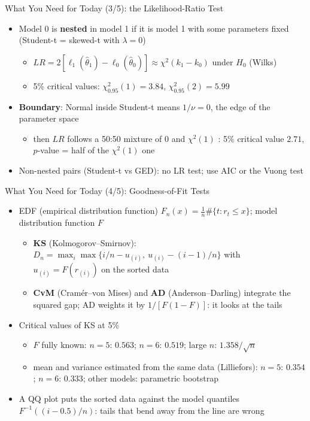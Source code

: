 \begin{frame}{What You Need for Today (3/5): the Likelihood-Ratio Test}
\itemsize{\small}
\begin{itemize}
    \item Model 0 is \textbf{nested} in model 1 if it is model 1 with some parameters fixed (Student-t = skewed-t with $\lambda = 0$)
    \begin{itemize}
        \item $LR = 2[\ell_1(\hat\theta_1) - \ell_0(\hat\theta_0)] \approx \chi^2(k_1 - k_0)$ under $H_0$ (Wilks)
        \item 5\% critical values: $\chi^2_{0.95}(1) = 3.84$, $\chi^2_{0.95}(2) = 5.99$
    \end{itemize}
    \item \textbf{Boundary}: Normal inside Student-t means $1/\nu = 0$, the edge of the parameter space
    \begin{itemize}
        \item then $LR$ follows a 50:50 mixture of 0 and $\chi^2(1)$ : 5\% critical value $2.71$, $p$-value = half of the $\chi^2(1)$ one
    \end{itemize}
    \item Non-nested pairs (Student-t vs GED): no LR test; use AIC or the Vuong test
\end{itemize}
\end{frame}

\begin{frame}{What You Need for Today (4/5): Goodness-of-Fit Tests}
\itemsize{\small}
\begin{itemize}
    \item EDF (empirical distribution function) $F_n(x) = \frac{1}{n}\#\{t: r_t \le x\}$; model distribution function $F$
    \begin{itemize}
        \item \textbf{KS} (Kolmogorov--Smirnov): $D_n = \max_i \max\{i/n - u_{(i)},\ u_{(i)} - (i-1)/n\}$ with $u_{(i)} = F(r_{(i)})$ on the sorted data
        \item \textbf{CvM} (Cramér--von Mises) and \textbf{AD} (Anderson--Darling) integrate the squared gap; AD weights it by $1/[F(1-F)]$: it looks at the tails
    \end{itemize}
    \item Critical values of KS at 5\%
    \begin{itemize}
        \item $F$ fully known: $n = 5$: $0.563$; $n = 6$: $0.519$; large $n$: $1.358/\sqrt{n}$
        \item mean and variance estimated from the same data (Lilliefors): $n = 5$: $0.354$; $n = 6$: $0.333$; other models: parametric bootstrap
    \end{itemize}
    \item A QQ plot puts the sorted data against the model quantiles $F^{-1}((i - 0.5)/n)$: tails that bend away from the line are wrong
\end{itemize}
\end{frame}


